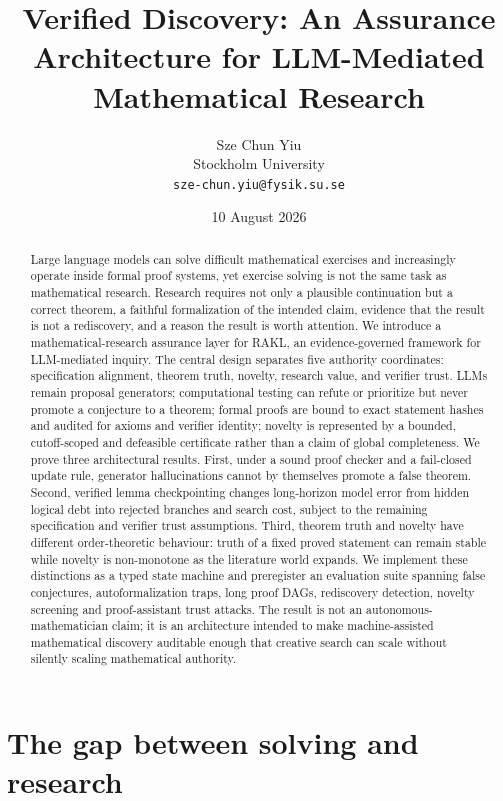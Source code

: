 \documentclass[11pt]{article}
\title{Verified Discovery: An Assurance Architecture for LLM-Mediated Mathematical Research}
\author{Sze Chun Yiu\\Stockholm University\\\texttt{sze-chun.yiu@fysik.su.se}}
\date{10 August 2026}
\newcommand{\RAKL}{\textsc{RAKL}}
\begin{document}
\maketitle

\begin{abstract}
Large language models can solve difficult mathematical exercises and increasingly operate inside formal proof systems, yet exercise solving is not the same task as mathematical research. Research requires not only a plausible continuation but a correct theorem, a faithful formalization of the intended claim, evidence that the result is not a rediscovery, and a reason the result is worth attention. We introduce a mathematical-research assurance layer for \RAKL{}, an evidence-governed framework for LLM-mediated inquiry. The central design separates five authority coordinates: specification alignment, theorem truth, novelty, research value, and verifier trust. LLMs remain proposal generators; computational testing can refute or prioritize but never promote a conjecture to a theorem; formal proofs are bound to exact statement hashes and audited for axioms and verifier identity; novelty is represented by a bounded, cutoff-scoped and defeasible certificate rather than a claim of global completeness. We prove three architectural results. First, under a sound proof checker and a fail-closed update rule, generator hallucinations cannot by themselves promote a false theorem. Second, verified lemma checkpointing changes long-horizon model error from hidden logical debt into rejected branches and search cost, subject to the remaining specification and verifier trust assumptions. Third, theorem truth and novelty have different order-theoretic behaviour: truth of a fixed proved statement can remain stable while novelty is non-monotone as the literature world expands. We implement these distinctions as a typed state machine and preregister an evaluation suite spanning false conjectures, autoformalization traps, long proof DAGs, rediscovery detection, novelty screening and proof-assistant trust attacks. The result is not an autonomous-mathematician claim; it is an architecture intended to make machine-assisted mathematical discovery auditable enough that creative search can scale without silently scaling mathematical authority.
\end{abstract}

\section{The gap between solving and research}
\end{document}
